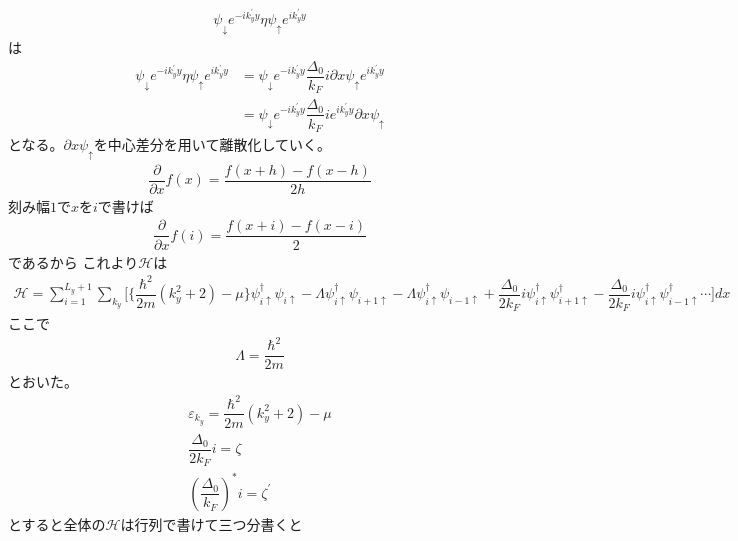 \documentclass{jarticle}
\begin{document}
\begin{align}
\psi_{\downarrow}e^{-ik_{y}^{'}y}\eta\psi_{\uparrow}e^{ik_{y}^{'}y}
\end{align}
は
\begin{align}
\psi_{\downarrow}e^{-ik_{y}^{'}y}\eta\psi_{\uparrow}e^{ik_{y}^{'}y}&=　\psi_{\downarrow}e^{-ik_{y}^{'}y}\dfrac{\Delta_0}{k_{F}}i\partial x\psi_{\uparrow}e^{ik_{y}^{'}y}\\
&=　\psi_{\downarrow}e^{-ik_{y}^{'}y}\dfrac{\Delta_0}{k_{F}}ie^{ik_{y}^{'}y}\partial x\psi_{\uparrow}
\end{align}
となる。$\partial x\psi_{\uparrow}$を中心差分を用いて離散化していく。
\begin{align}
\dfrac{\partial}{\partial x}f(x)=\dfrac{f(x+h)-f(x-h)}{2h}
\end{align}
刻み幅$1$で$x$を$i$で書けば
\begin{align}
\dfrac{\partial}{\partial x}f(i)=\dfrac{f(x+i)-f(x-i)}{2}
\end{align}
であるから
これより$\mathcal{H}$は
\begin{align}
\mathcal{H}
=\sum_{i=1}^{L_y+1}\displaystyle\sum_{k_y}\Big[\big\{\dfrac{\hbar^2}{2m}(k_y^2+2)-\mu\big\}\psi_{i\uparrow}^{\dagger}\psi_{i\uparrow}-\Lambda\psi_{i\uparrow}^{\dagger}\psi_{i+1\uparrow}-\Lambda\psi_{i\uparrow}^{\dagger}\psi_{i-1\uparrow}+\dfrac{\Delta_0}{2k_{F}}i\psi_{i\uparrow}^{\dagger}\psi_{{i+1}\uparrow}^{\dagger}-\dfrac{\Delta_0}{2k_{F}}i\psi_{i\uparrow}^{\dagger}\psi_{{i-1}\uparrow}^{\dagger}\cdots\Big]dx
\end{align}
ここで
\begin{align}
\Lambda=\dfrac{\hbar^2}{2m}
\end{align}
とおいた。
\begin{align}
\varepsilon_{k_y}=\dfrac{\hbar^2}{2m}(k_y^2+2)-\mu\\
\dfrac{\Delta_0}{2k_{F}}i=\zeta\\
\left(\dfrac{\Delta_0}{k_{F}}\right)^{*}i=\zeta^{'}
\end{align}
とすると全体の$\mathcal{H}$は行列で書けて三つ分書くと
\end{document}
